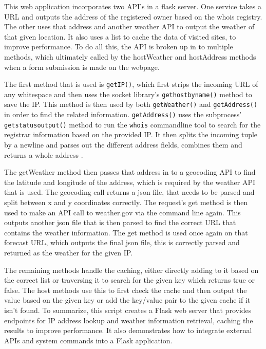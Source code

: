 	This web application incorporates two API's in a flask server. One service takes a URL and outputs the address of the registered owner based on the whois \cite{rfc3912} registry. The other uses that address and another weather API \cite{weather2009national} to output the weather of that given location. It also uses a list to cache the data of visited sites, to improve performance. To do all this, the API is broken up in to multiple methods, which ultimately called by the hostWeather and hostAddress methods when a form submission is made on the webpage.
	
	The first method that is used is \verb+getIP()+, which first strips the incoming URL of any whitespace and then uses the socket library's \verb+gethostbyname()+ method to save the IP. This method is then used by both \verb+getWeather()+ and \verb+getAddress()+ in order to find the related information. \verb+getAddress()+ uses the subprocess' \verb+getstatusoutput()+ method to run the \verb+whois+ commandline tool to search for the registrar information based on the provided IP. It then splits the incoming tuple by a newline and parses out the different address fields, combines them and returns a whole address \cite{CensusBureau_2023a}. 
	
	The getWeather method then passes that address in to a geocoding API to find the latitude and longitude of the address, which is required by the weather API that is used. The geocoding call returns a json file, that needs to be parsed and split between x and y coordinates correctly. The request's get method is then used to make an API call to weather.gov \cite{weather2009national} via the command line again. This outputs another json file that is then parsed to find the correct URL that contains the weather information. The get method is used once again on that forecast URL, which outputs the final json file, this is correctly parsed and returned as the weather for the given IP.

	The remaining methods handle the caching, either directly adding to it based on the correct list or traversing it to search for the given key which returns true or false. The host methods use this to first check the cache and then output the value based on the given key or add the key/value pair to the given cache if it isn't found. To summarize, this script creates a Flask web server that provides endpoints for IP address lookup and weather information retrieval, caching the results to improve performance. It also demonstrates how to integrate external APIs and system commands into a Flask application.


